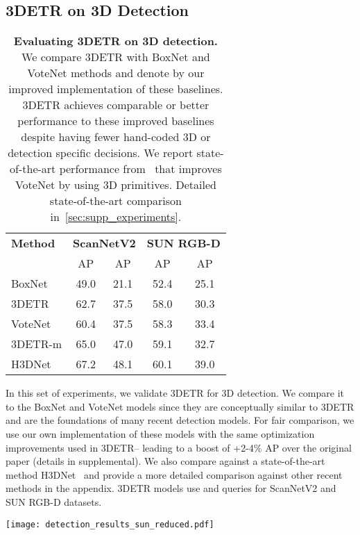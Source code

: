 \documentclass[10pt,twocolumn,letterpaper]{article}
\newcommand{\OURS}{3DETR\xspace}
\newcommand{\OURSm}{3DETR-m\xspace}
\newcommand{\sunrgbd}{SUN RGB-D\xspace}
\newcommand{\scannet}{ScanNetV2\xspace}
\newcommand{\colorrow}{\rowcolor{highlightRowColor}}
\begin{document}
\subsection{\OURS on 3D Detection}
\label{sec:comparison}

\begin{table}[!t]
          \centering
    \begin{tabular}{@{}l|cccc@{}}
    \toprule
    \textbf{Method} & \multicolumn{2}{c}{\textbf{\scannet}} & \multicolumn{2}{c}{\textbf{\sunrgbd}}\\
    & AP & AP & AP & AP \\
    \hline
    BoxNet~\cite{qi2019votenet} & 49.0 & 21.1 & 52.4 & 25.1 \\
    \colorrow \OURS & 62.7 & 37.5 & 58.0 & 30.3 \\
\hline
    VoteNet~\cite{qi2019votenet} & 60.4 & 37.5 & 58.3 & 33.4 \\
    \colorrow \OURSm & 65.0 & 47.0 & 59.1 & 32.7 \\
\hline
    H3DNet~\cite{zhang2020h3dnet} & 67.2 & 48.1 & 60.1 & 39.0 \\
    \bottomrule
                \end{tabular}
\vspace{-0.1in}
\caption{\textbf{Evaluating \OURS on 3D detection.}
We compare \OURS with BoxNet and VoteNet methods and denote by  our improved implementation of these baselines.
\OURS achieves comparable or better performance to these improved baselines despite having fewer hand-coded 3D or detection specific decisions.
We report state-of-the-art performance from~\cite{zhang2020h3dnet} that improves VoteNet by using 3D primitives. Detailed state-of-the-art comparison in~\cref{sec:supp_experiments}.
}
\label{tab:comparison}
\end{table}


In this set of experiments, we validate \OURS for 3D detection.
We compare it to the BoxNet and VoteNet models since they are conceptually similar to \OURS and are the foundations of many recent detection models.
For fair comparison, we use our own implementation of these models with the same optimization improvements used in \OURS -- leading to a boost of +2-4\% AP over the original paper (details in supplemental).
We also compare against a state-of-the-art method H3DNet~\cite{zhang2020h3dnet} and provide a more detailed comparison against other recent methods in the appendix.
\OURS models use  and  queries for \scannet and \sunrgbd datasets.
\begin{figure*}[!t]
\centering
\texttt{[image: detection\_results\_sun\_reduced.pdf]}
\vspace{-0.1in}
\caption{\textbf{Qualitative Results using \OURS.} Detection results for scenes from the val set of the \sunrgbd dataset.
\OURS does not use color information (used only for visualization) and predicts boxes from point clouds.
\OURS can detect objects even with single-view depth scans and predicts amodal boxes \eg, the full extent of the bed (top left) including objects missing in the ground truth (top right).
\label{fig:detection_results}
}
\end{figure*}
\end{document}
